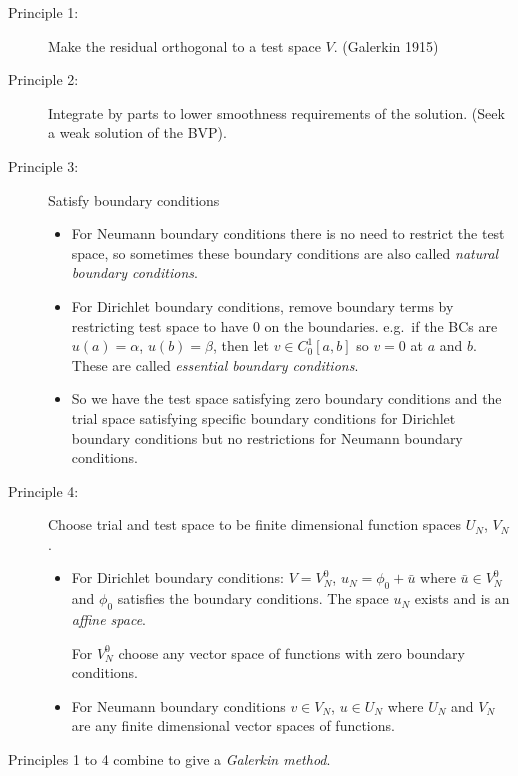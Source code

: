 \documentclass[12pt, a4paper]{article}
\theoremstyle{definition}
\theoremstyle{remark}
\numberwithin{equation}{section}
\begin{document}
\begin{description}
\item [Principle 1:] Make the residual orthogonal to a test space $V$. (Galerkin 1915)
\item [Principle 2:] Integrate by parts to lower smoothness requirements of the solution. (Seek a weak solution of the BVP).
\item [Principle 3:] Satisfy boundary conditions
\begin{itemize}
\item For Neumann boundary conditions there is no need to restrict the test space, so sometimes these boundary conditions are also called \emph{natural boundary conditions}.
\item For Dirichlet boundary conditions, remove boundary terms by restricting test space to have $0$ on the boundaries. e.g.\ if the BCs are $u(a)=\alpha$, $u(b)=\beta$, then let $v \in C^1_0[a,b]$ so $v=0$ at $a$ and $b$. These are called \emph{essential boundary conditions}.
\item So we have the test space satisfying zero boundary conditions and the trial space satisfying specific boundary conditions for Dirichlet boundary conditions but no restrictions for Neumann boundary conditions.
\end{itemize}
\item [Principle 4:] Choose trial and test space to be finite dimensional function spaces $U_N$, $V_N$.
\begin{itemize}
\item For Dirichlet boundary conditions: $V=V^0_N$, $u_N=\phi_0+\bar{u}$ where $\bar{u}\in V^{0}_N$ and $\phi_0$ satisfies the boundary conditions. The space $u_N$ exists and is an \emph{affine space}.

For $V^0_N$ choose any vector space of functions with zero boundary conditions.

\item For Neumann boundary conditions $v \in V_N$, $u \in U_N$ where $U_N$ and $V_N$ are any finite dimensional vector spaces of functions.
\end{itemize}
\end{description}

Principles 1 to 4 combine to give a \emph{Galerkin method}.
\end{document}
